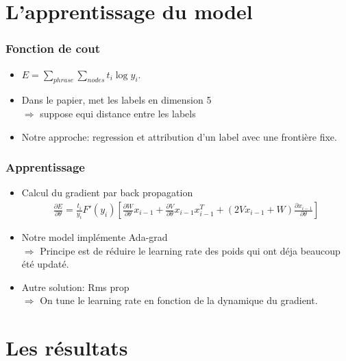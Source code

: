 \documentclass{beamer}
\begin{document}
\section{L'apprentissage du model}

\begin{frame}
\frametitle{Fonction de cout}
\begin{itemize}\setlength{\itemsep}{7mm}
\item $ \displaystyle   E = \sum_{phrase}\sum_{nodes} t_i \log y_i$.
\item Dans le papier, met les labels en dimension 5\\
$\Rightarrow$ suppose equi distance entre les labels
\item Notre approche: regression et attribution d'un label avec une frontière fixe.
\end{itemize}
\end{frame}


\begin{frame}
\frametitle{Apprentissage}
\begin{itemize}\setlength{\itemsep}{7mm}
\item Calcul du gradient par back propagation
\begin{align*}
	\frac{\partial E}{\partial \theta} = \frac{t_i}{y_i} F'(y_i)\left[\frac{\partial W}{\partial \theta}x_{i-1} + \frac{\partial V}{\partial \theta} x_{i-1}x_{i-1}^T + \left( 2 V x_{i-1} + W  \right) \frac{\partial x_{i-1}}{\partial \theta} \right]
\end{align*}
\item Notre model implémente Ada-grad \\
$\Rightarrow$ Principe est de réduire le learning rate des poids qui ont déja beaucoup été updaté.
\item Autre solution: Rms prop\\
$\Rightarrow$ On tune le learning rate en fonction de la dynamique du gradient.
\end{itemize}
\end{frame}

\section{Les résultats }
\end{document}
